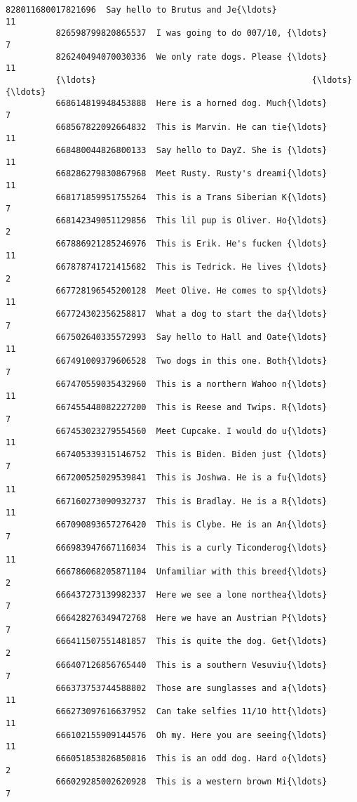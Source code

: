 \documentclass[11pt]{article}
\begin{document}
\begin{Verbatim}[commandchars=\\\{\}]
          828011680017821696  Say hello to Brutus and Je{\ldots}                11   
          826598799820865537  I was going to do 007/10, {\ldots}                 7   
          826240494070030336  We only rate dogs. Please {\ldots}                11   
          {\ldots}                                           {\ldots}               {\ldots}   
          668614819948453888  Here is a horned dog. Much{\ldots}                 7   
          668567822092664832  This is Marvin. He can tie{\ldots}                11   
          668480044826800133  Say hello to DayZ. She is {\ldots}                11   
          668286279830867968  Meet Rusty. Rusty's dreami{\ldots}                11   
          668171859951755264  This is a Trans Siberian K{\ldots}                 7   
          668142349051129856  This lil pup is Oliver. Ho{\ldots}                 2   
          667886921285246976  This is Erik. He's fucken {\ldots}                11   
          667878741721415682  This is Tedrick. He lives {\ldots}                 2   
          667728196545200128  Meet Olive. He comes to sp{\ldots}                11   
          667724302356258817  What a dog to start the da{\ldots}                 7   
          667502640335572993  Say hello to Hall and Oate{\ldots}                11   
          667491009379606528  Two dogs in this one. Both{\ldots}                 7   
          667470559035432960  This is a northern Wahoo n{\ldots}                11   
          667455448082227200  This is Reese and Twips. R{\ldots}                 7   
          667453023279554560  Meet Cupcake. I would do u{\ldots}                11   
          667405339315146752  This is Biden. Biden just {\ldots}                 7   
          667200525029539841  This is Joshwa. He is a fu{\ldots}                11   
          667160273090932737  This is Bradlay. He is a R{\ldots}                11   
          667090893657276420  This is Clybe. He is an An{\ldots}                 7   
          666983947667116034  This is a curly Ticonderog{\ldots}                11   
          666786068205871104  Unfamiliar with this breed{\ldots}                 2   
          666437273139982337  Here we see a lone northea{\ldots}                 7   
          666428276349472768  Here we have an Austrian P{\ldots}                 7   
          666411507551481857  This is quite the dog. Get{\ldots}                 2   
          666407126856765440  This is a southern Vesuviu{\ldots}                 7   
          666373753744588802  Those are sunglasses and a{\ldots}                11   
          666273097616637952  Can take selfies 11/10 htt{\ldots}                11   
          666102155909144576  Oh my. Here you are seeing{\ldots}                11   
          666051853826850816  This is an odd dog. Hard o{\ldots}                 2   
          666029285002620928  This is a western brown Mi{\ldots}                 7   
          

\end{Verbatim}
\end{document}
